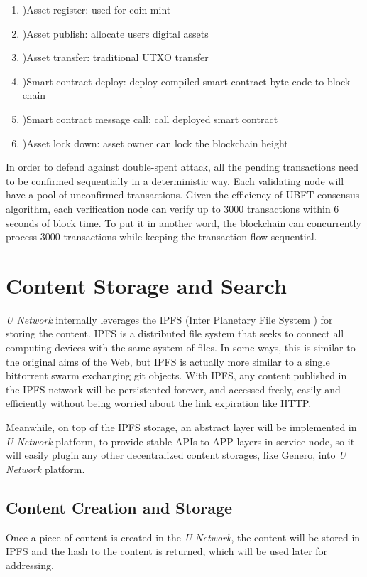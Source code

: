 	\begin{enumerate}
	\item )Asset register: used for coin mint
	\item )Asset publish: allocate users digital assets
    \item )Asset transfer: traditional UTXO transfer
    \item )Smart contract deploy: deploy compiled smart contract byte code to block chain
    \item )Smart contract message call: call deployed smart contract
    \item )Asset lock down: asset owner can lock the blockchain height
	\end{enumerate}
	
In order to defend against double-spent attack, all the pending transactions need to be confirmed sequentially in a deterministic way. Each validating node will have a pool of unconfirmed transactions. Given the efficiency of UBFT consensus algorithm, each verification node can verify up to 3000 transactions within 6 seconds of block time. To put it in another word, the blockchain can concurrently process 3000 transactions while keeping the transaction flow sequential. 



\section{Content Storage and Search}
\emph{U Network} internally leverages the IPFS (Inter Planetary File System \cite{ipfs}) for storing the content. IPFS is a distributed file system that seeks to connect all computing devices with the same system of files. In some ways, this is similar to the original aims of the Web, but IPFS is actually more similar to a single bittorrent swarm exchanging git objects. With IPFS, any content published in the IPFS network will be persistented forever, and accessed freely, easily and efficiently without being worried about the link expiration like HTTP. 

Meanwhile, on top of the IPFS storage, an abstract layer will be implemented in \emph{U Network} platform, to provide stable APIs to APP layers in service node, so it will easily plugin any other decentralized content storages, like Genero, into \emph{U Network} platform.

\subsection{Content Creation and Storage}
Once a piece of content is created in the \emph{U Network}, the content will be stored in IPFS and the hash to the content is returned, which will be used later for addressing. 

